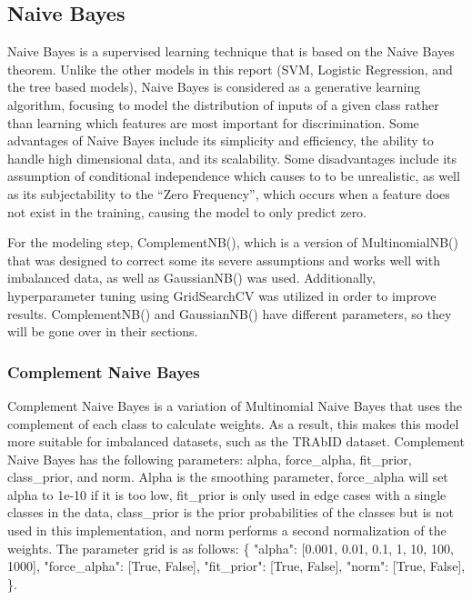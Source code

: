 \subsection{Naive Bayes}
Naive Bayes is a supervised learning technique that is based on the Naive Bayes theorem. Unlike the other models in this report (SVM, Logistic Regression, and the tree based models), Naive Bayes is considered as a generative learning algorithm, focusing to model the distribution of inputs of a given class rather than learning which features are most important for discrimination. Some advantages of Naive Bayes include its simplicity and efficiency, the ability to handle high dimensional data, and its scalability. Some disadvantages include its assumption of conditional independence which causes to to be unrealistic, as well as its subjectability to the ``Zero Frequency'', which occurs when a feature does not exist in the training, causing the model to only predict zero.

For the modeling step, ComplementNB(), which is a version of MultinomialNB() that was designed to correct some its severe assumptions and works well with imbalanced data, as well as GaussianNB() was used. Additionally, hyperparameter tuning using GridSearchCV was utilized in order to improve results. ComplementNB() and GaussianNB() have different parameters, so they will be gone over in their sections.

\subsubsection{Complement Naive Bayes}
Complement Naive Bayes is a variation of Multinomial Naive Bayes that uses the complement of each class to calculate weights. As a result, this makes this model more suitable for imbalanced datasets, such as the TRAbID dataset. Complement Naive Bayes has the following parameters: alpha, force\_alpha, fit\_prior, class\_prior, and norm. Alpha is the smoothing parameter, force\_alpha will set alpha to 1e-10 if it is too low, fit\_prior is only used in edge cases with a single classes in the data, class\_prior is the prior probabilities of the classes but is not used in this implementation, and norm performs a second normalization of the weights. The parameter grid is as follows: 
 \{
     "alpha": [0.001, 0.01, 0.1, 1, 10, 100, 1000],
     "force\_alpha": [True, False],
     "fit\_prior": [True, False],
     "norm": [True, False],
 \}.

